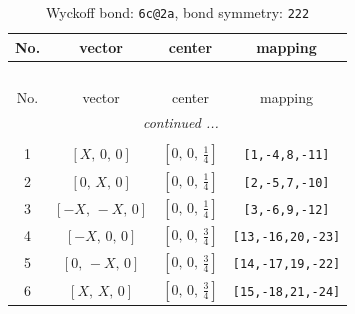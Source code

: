 \documentclass[fleqn,8pt]{jsarticle}
\begin{document}
\begin{longtable}{cccc}
\caption{Wyckoff bond: {\tt 6c@2a}, bond symmetry: {\tt 222}}
 \\
 \hline \hline
No. & vector & center & mapping \\ \hline \endfirsthead

\multicolumn{3}{l}{\tablename\ \thetable{}} \\
 \hline \hline
No. & vector & center & mapping \\ \hline \endhead

 \hline \hline
\multicolumn{3}{r}{\footnotesize\it continued ...} \\ \endfoot

 \hline \hline
\multicolumn{3}{r}{} \\ \endlastfoot

1 & $\left[ X,\, 0,\, 0 \right]$ & $\left[ 0,\, 0,\, \frac{1}{4} \right]$ & {\tt [1,-4,8,-11]} \\ \hline
2 & $\left[ 0,\, X,\, 0 \right]$ & $\left[ 0,\, 0,\, \frac{1}{4} \right]$ & {\tt [2,-5,7,-10]} \\ \hline
3 & $\left[ - X,\, - X,\, 0 \right]$ & $\left[ 0,\, 0,\, \frac{1}{4} \right]$ & {\tt [3,-6,9,-12]} \\ \hline
4 & $\left[ - X,\, 0,\, 0 \right]$ & $\left[ 0,\, 0,\, \frac{3}{4} \right]$ & {\tt [13,-16,20,-23]} \\ \hline
5 & $\left[ 0,\, - X,\, 0 \right]$ & $\left[ 0,\, 0,\, \frac{3}{4} \right]$ & {\tt [14,-17,19,-22]} \\ \hline
6 & $\left[ X,\, X,\, 0 \right]$ & $\left[ 0,\, 0,\, \frac{3}{4} \right]$ & {\tt [15,-18,21,-24]} \\
\end{longtable}
\renewcommand{\arraystretch}{1.2}
\end{document}
